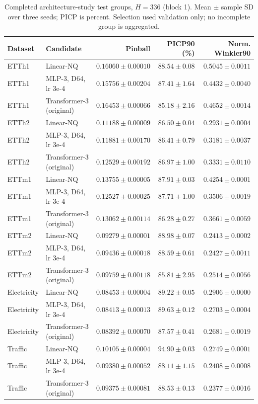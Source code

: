 \begin{table}[t]
\centering\small
\caption{Completed architecture-study test groups, $H=336$ (block 1). Mean $\pm$ sample SD over three seeds; PICP is percent. Selection used validation only; no incomplete group is aggregated.}
\label{tab:architecture-test-336-0}
\begin{tabular}{@{}llrrr@{}}
\toprule
Dataset & Candidate & Pinball & PICP90 (\%) & Norm. Winkler90 \\
\midrule
ETTh1 & Linear-NQ & $0.16060\pm0.00010$ & $88.54\pm0.08$ & $0.5045\pm0.0011$ \\
ETTh1 & MLP-3, D64, lr 3e-4 & $0.15756\pm0.00204$ & $87.41\pm1.64$ & $0.4432\pm0.0040$ \\
ETTh1 & Transformer-3 (original) & $0.16453\pm0.00066$ & $85.18\pm2.16$ & $0.4652\pm0.0014$ \\
ETTh2 & Linear-NQ & $0.11188\pm0.00009$ & $86.50\pm0.04$ & $0.2931\pm0.0004$ \\
ETTh2 & MLP-3, D64, lr 3e-4 & $0.11881\pm0.00170$ & $86.41\pm0.79$ & $0.3181\pm0.0037$ \\
ETTh2 & Transformer-3 (original) & $0.12529\pm0.00192$ & $86.97\pm1.00$ & $0.3331\pm0.0110$ \\
ETTm1 & Linear-NQ & $0.13755\pm0.00005$ & $87.91\pm0.03$ & $0.4254\pm0.0001$ \\
ETTm1 & MLP-3, D64, lr 3e-4 & $0.12527\pm0.00025$ & $87.71\pm1.00$ & $0.3506\pm0.0019$ \\
ETTm1 & Transformer-3 (original) & $0.13062\pm0.00114$ & $86.28\pm0.27$ & $0.3661\pm0.0059$ \\
ETTm2 & Linear-NQ & $0.09279\pm0.00001$ & $88.98\pm0.07$ & $0.2413\pm0.0002$ \\
ETTm2 & MLP-3, D64, lr 3e-4 & $0.09436\pm0.00018$ & $88.59\pm0.61$ & $0.2427\pm0.0011$ \\
ETTm2 & Transformer-3 (original) & $0.09759\pm0.00118$ & $85.81\pm2.95$ & $0.2514\pm0.0056$ \\
Electricity & Linear-NQ & $0.08453\pm0.00004$ & $89.22\pm0.05$ & $0.2906\pm0.0000$ \\
Electricity & MLP-3, D64, lr 3e-4 & $0.08413\pm0.00013$ & $89.63\pm0.12$ & $0.2703\pm0.0004$ \\
Electricity & Transformer-3 (original) & $0.08392\pm0.00070$ & $87.57\pm0.41$ & $0.2681\pm0.0019$ \\
Traffic & Linear-NQ & $0.10105\pm0.00004$ & $94.90\pm0.03$ & $0.2749\pm0.0001$ \\
Traffic & MLP-3, D64, lr 3e-4 & $0.09380\pm0.00052$ & $88.11\pm1.15$ & $0.2408\pm0.0008$ \\
Traffic & Transformer-3 (original) & $0.09375\pm0.00081$ & $88.53\pm0.13$ & $0.2377\pm0.0016$ \\
\bottomrule
\end{tabular}
\end{table}


